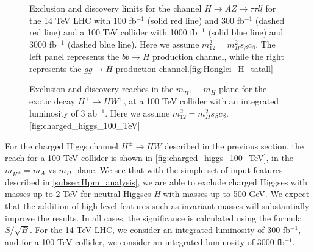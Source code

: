 {\begin{figure}
  \begin{sidecaption}{Exclusion and discovery limits for the channel $H\rightarrow AZ\rightarrow \tau\tau ll$ for the 14 TeV LHC with 100 fb$^{-1}$ (solid red line) and 300 fb$^{-1}$ (dashed red line) and a 100 TeV collider with 1000 fb$^{-1}$ (solid blue line) and 3000 fb$^{-1}$ (dashed blue line). Here we assume $m_{12}^2 = m_H^2s_\beta c_\beta$. The left panel represents the $bb\rightarrow H$ production channel, while the right represents the $gg\rightarrow H$ production channel.}[fig:Honglei_H_tatall]

\end{sidecaption}
\end{figure}

\begin{figure}
  \begin{sidecaption}{Exclusion and discovery reaches in the $m_{H^\pm}-m_{H}$ plane for the exotic decay $H^\pm\rightarrow HW^\pm$, at a 100 TeV collider with an integrated luminosity of 3 ab$^{-1}$. Here we assume $m_{12}^2 = m_H^2s_\beta c_\beta$.}[fig:charged_higgs_100_TeV]
    
  \end{sidecaption}
\end{figure}

For the charged Higgs channel $H^\pm\rightarrow HW$ described in the previous section, the reach for a 100 TeV collider is shown in \autoref{fig:charged_higgs_100_TeV}, in the $m_{H^\pm} = m_A$ vs $m_H$ plane. We see that with the simple set of input features described in \autoref{subsec:Hpm_analysis}, we are able to exclude charged Higgses with masses up to 2 TeV for neutral Higgses \emph{H} with masses up to 500 GeV. We expect that the addition of high-level features such as invariant masses will substantially improve the results. In all cases, the significance is calculated using the formula $S/\sqrt{B}$. For the 14 TeV LHC, we consider an integrated luminosity of 300 fb$^{-1}$, and for a 100 TeV collider, we consider an integrated luminosity of 3000 fb$^{-1}$.


}
